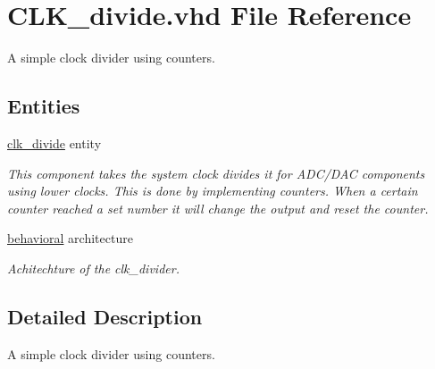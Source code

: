 \hypertarget{CLK__divide_8vhd}{\section{C\-L\-K\-\_\-divide.\-vhd File Reference}
\label{CLK__divide_8vhd}
}


A simple clock divider using counters.  


\subsection*{Entities}
\begin{DoxyCompactItemize}
\item 
\hyperlink{classclk__divide}{clk\-\_\-divide} entity
\begin{DoxyCompactList}\small\item\em This component takes the system clock divides it for A\-D\-C/\-D\-A\-C components using lower clocks. This is done by implementing counters. When a certain counter reached a set number it will change the output and reset the counter. \end{DoxyCompactList}\item 
\hyperlink{classclk__divide_1_1behavioral}{behavioral} architecture
\begin{DoxyCompactList}\small\item\em Achitechture of the clk\-\_\-divider. \end{DoxyCompactList}\end{DoxyCompactItemize}


\subsection{Detailed Description}
A simple clock divider using counters. 